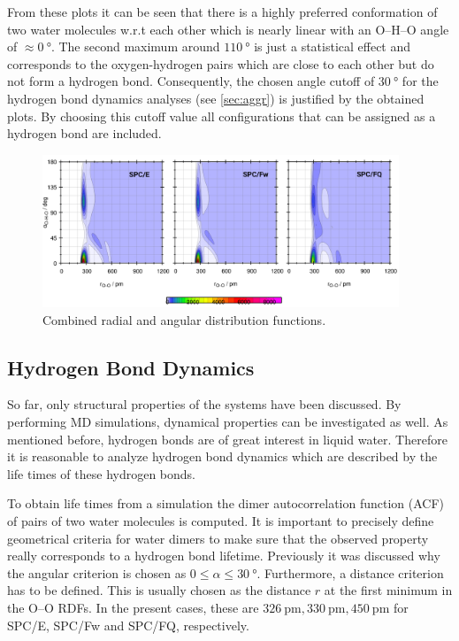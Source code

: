 \documentclass[a4paper,12pt]{scrartcl}
\begin{document}
		From these plots it can be seen that there is a highly preferred conformation of two water molecules w.r.t each other which is nearly linear with an O--H--O angle of $\approx \SI{0}{\degree} $. The second maximum around $ \SI{110}{\degree}  $ is just a statistical effect and corresponds to the oxygen-hydrogen pairs which are close to each other but do not form a hydrogen bond. Consequently, the chosen angle cutoff of $ \SI{30}{\degree} $ for the hydrogen bond dynamics analyses (see \autoref{sec:aggr}) is justified by the obtained plots. By choosing this cutoff value all configurations that can be assigned as a hydrogen bond are included. 
		\begin{figure}
			\centering
			\includegraphics[width=0.95\textwidth]{cdf}
			\caption{Combined radial and angular distribution functions.}
			\label{fig:cdf}
		\end{figure}
	\subsection{Hydrogen Bond Dynamics}
	\label{sec:aggr}
		So far, only structural properties of the systems have been discussed. By performing MD simulations, dynamical properties can be investigated as well. As mentioned before, hydrogen bonds are of great interest in liquid water. Therefore it is reasonable to analyze hydrogen bond dynamics which are described by the life times of these hydrogen bonds. 
		
		To obtain life times from a simulation the dimer autocorrelation function (ACF) of pairs of two water molecules is computed. It is important to precisely define geometrical criteria for water dimers to make sure that the observed property really corresponds to a hydrogen bond lifetime. Previously it was discussed why the angular criterion is chosen as $ 0 \leq \alpha \leq \SI{30}{\degree} $. Furthermore, a distance criterion has to be defined. This is usually chosen as the distance $ r $ at the first minimum in the O--O RDFs. In the present cases, these are $ \SI{326}{\pico\meter}, \SI{330}{\pico\meter}, \SI{450}{\pico\meter}$ for SPC/E, SPC/Fw and SPC/FQ, respectively.
		
\end{document}
